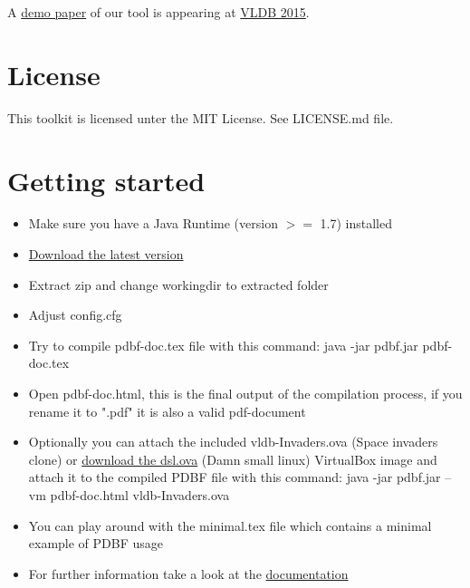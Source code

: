 \documentclass[11pt]{article}
\begin{document}
\noindent A \href{https://infosys.uni-saarland.de/publications/p1972-dittrich.html}{demo paper} of our tool is appearing at \href{http://www.vldb.org/2015/}{VLDB 2015}. 

\section{License}
\noindent This toolkit is licensed unter the MIT License. See LICENSE.md file.\\

\section{Getting started}
\begin{itemize}
\item Make sure you have a Java Runtime (version $>=$ 1.7) installed
\item \href{https://github.com/uds-datalab/PDBF/archive/gh-pages.zip}{Download the latest version}
\item Extract zip and change workingdir to extracted folder
\item Adjust config.cfg
\item Try to compile pdbf-doc.tex file with this command: java -jar pdbf.jar pdbf-doc.tex
\item Open pdbf-doc.html, this is the final output of the compilation process, if you rename it to ".pdf" it is also a valid pdf-document
\item Optionally you can attach the included vldb-Invaders.ova (Space invaders clone) or \href{https://github.com/uds-datalab/PDBF/releases/download/1.0.1/dsl.ova}{download the dsl.ova} (Damn small linux) VirtualBox image and attach it to the compiled PDBF file with this command: java -jar pdbf.jar --vm pdbf-doc.html vldb-Invaders.ova
\item You can play around with the minimal.tex file which contains a minimal example of PDBF usage
\item For further information take a look at the \href{http://uds-datalab.github.io/PDBF/}{documentation}
\end{itemize}
\end{document}
